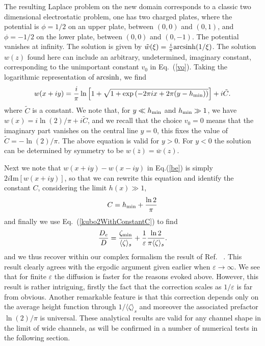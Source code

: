 \documentclass[pre,showpacs,preprintnumbers,amsmath,amssymb,superscriptaddress]{revtex4-1}
\begin{document}
{{The resulting Laplace problem on the new domain corresponds to a classic two dimensional electrostatic problem, one has  two charged plates, where the potential is $\phi=1/2$ on an upper plate, between $(0,0)$ and $(0,1)$, and $\phi=-1/2$ on the lower plate, between $(0,0)$ and $(0,-1)$. The potential vanishes at infinity. The solution is given by $\tilde w(\xi)=\frac{i}{\pi}\rm{arcsinh}(1/\xi)$. 
The solution $w(z)$ found here can include an arbitrary, undetermined, imaginary constant, corresponding to the unimportant constant $v_0$ in Eq.~(\ref{vo}). Taking the logarithmic representation of $\rm{arcsinh}$,
we find
\begin{equation}
w(x+iy)=\frac{i}{\pi} \ln \left[1+\sqrt{1+\exp \left(-{2\pi}ix + {2\pi}(y-h_{\rm min})\right)}\right] +i\tilde C.\label{explicit}
\end{equation}
where $\tilde C$ is a constant. We note that, for $y\ll h_{\rm min}$ and $h_{\rm min} \gg 1$, we have $w(x)= i \ln(2) / \pi + i\tilde C$, and we recall  that the choice $v_0=0$ means that the imaginary part vanishes on the central line $y=0$, this fixes the value of $\tilde C=- \ln(2) /\pi $. The above equation is valid for $y>0$. For $y<0$ the solution can be  determined  by symmetry to be $w(\overline z)=\overline w(z)$. 

Next we note that $w(x+iy)-w(x-iy)$ in Eq.(\ref{be}) is simply $2i\text{Im}[w(x+iy)]$, so that we can rewrite this equation and identify the constant $C$, considering the limit $h(x) \gg 1$,
\begin{align}
C= h_{\rm min} + \frac{\ln 2}{\pi}
\end{align}
and finally we use Eq.~(\ref{kubo2WithConstantC}) to find
\begin{equation}
\frac{D_e}{D} =  \frac{\zeta_{\rm min}}{\langle \zeta\rangle_s}+ \frac{1}{\varepsilon}\frac{\ln 2}{\pi\langle \zeta\rangle_s}.
\end{equation}
and we thus recover within our complex formalism the result of Ref.~ \cite{man2017}. This result clearly agrees with the ergodic argument given earlier  when $\varepsilon\to \infty$. We see that for finite $\varepsilon$ the diffusion is faster for the reasons evoked above. However, this result is rather intriguing, firstly the fact that the correction scales as $1/\varepsilon$ is far from obvious. Another remarkable feature is that this correction depends only on the average height function through $1/\langle\zeta\rangle_s$ and moreover the associated prefactor $\ln(2)/\pi$ is universal. These analytical results are valid for any channel shape in the limit of wide channels, as will be confirmed in a  number of numerical tests in the following section.

}}
\end{document}
